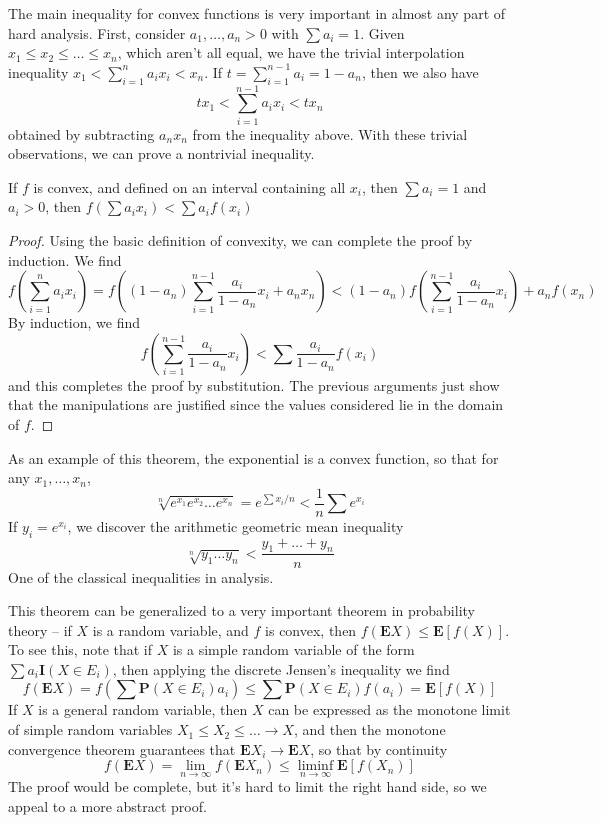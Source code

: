 The main inequality for convex functions is very important in almost any part of hard analysis. First, consider $a_1, \dots, a_n > 0$ with $\sum a_i = 1$. Given $x_1 \leq x_2 \leq \dots \leq x_n$, which aren't all equal, we have the trivial interpolation inequality $x_1 < \sum_{i = 1}^n a_i x_i < x_n$. If $t = \sum_{i = 1}^{n-1} a_i = 1 - a_n$, then we also have
%
\[ t x_1 < \sum_{i = 1}^{n-1} a_i x_i < t x_n \]
%
obtained by subtracting $a_n x_n$ from the inequality above. With these trivial observations, we can prove a nontrivial inequality.

\begin{theorem}
    If $f$ is convex, and defined on an interval containing all $x_i$, then $\sum a_i = 1$ and $a_i > 0$, then $f(\sum a_i x_i) < \sum a_i f(x_i)$
\end{theorem}
\begin{proof}
    Using the basic definition of convexity, we can complete the proof by induction. We find
    \[ f \left(\sum_{i = 1}^n a_i x_i \right) = f \left( (1 - a_n) \sum_{i = 1}^{n-1} \frac{a_i}{1 - a_n} x_i + a_n x_n \right) < (1 - a_n) f \left( \sum_{i = 1}^{n-1} \frac{a_i}{1 - a_n} x_i \right) + a_n f(x_n) \]
    By induction, we find
    \[ f \left( \sum_{i = 1}^{n-1} \frac{a_i}{1 - a_n} x_i \right) < \sum \frac{a_i}{1 - a_n} f(x_i) \]
    and this completes the proof by substitution. The previous arguments just show that the manipulations are justified since the values considered lie in the domain of $f$.
\end{proof}

As an example of this theorem, the exponential is a convex function, so that for any $x_1, \dots, x_n$,
%
\[ \sqrt[n]{e^{x_1} e^{x_2} \dots e^{x_n}} = e^{\sum x_i/n} < \frac{1}{n} \sum e^{x_i} \]
%
If $y_i = e^{x_i}$, we discover the arithmetic geometric mean inequality
%
\[ \sqrt[n]{y_1 \dots y_n} < \frac{y_1 + \dots + y_n}{n} \]
%
One of the classical inequalities in analysis.

This theorem can be generalized to a very important theorem in probability theory -- if $X$ is a random variable, and $f$ is convex, then $f(\mathbf{E}X) \leq \mathbf{E}[f(X)]$. To see this, note that if $X$ is a simple random variable of the form $\sum a_i \mathbf{I}(X \in E_i)$, then applying the discrete Jensen's inequality we find
%
\[ f(\mathbf{E}X) = f \left( \sum \mathbf{P}(X \in E_i) a_i \right) \leq \sum \mathbf{P}(X \in E_i) f(a_i) = \mathbf{E}[f(X)] \]
%
If $X$ is a general random variable, then $X$ can be expressed as the monotone limit of simple random variables $X_1 \leq X_2 \leq \dots \to X$, and then the monotone convergence theorem guarantees that $\mathbf{E}X_i \to \mathbf{E}X$, so that by continuity
%
\[ f(\mathbf{E}X) = \lim_{n \to \infty} f(\mathbf{E}X_n) \leq \liminf_{n \to \infty} \mathbf{E}[f(X_n)] \]
%
The proof would be complete, but it's hard to limit the right hand side, so we appeal to a more abstract proof.


